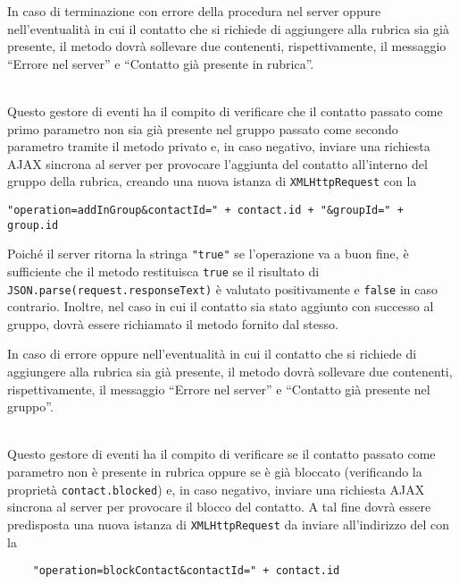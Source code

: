 \begin{description}
In caso di terminazione con errore della procedura nel server oppure nell'eventualità in cui il contatto che si richiede di aggiungere alla rubrica sia già presente, il metodo dovrà sollevare due  contenenti, rispettivamente, il messaggio ``Errore nel server'' e ``Contatto già presente in rubrica''.

\item{}\\
Questo gestore di eventi ha il compito di verificare che il contatto passato come primo parametro non sia già presente nel gruppo passato come secondo parametro tramite il metodo privato  e, in caso negativo, inviare una richiesta AJAX sincrona al server per provocare l'aggiunta del contatto all'interno del gruppo della rubrica, creando una nuova istanza di \verb'XMLHttpRequest' con la 
\begin{verbatim}
"operation=addInGroup&contactId=" + contact.id + "&groupId=" + group.id
\end{verbatim}

Poiché il server ritorna la stringa \verb'"true"' se l'operazione va a buon fine, è sufficiente che il metodo restituisca \verb'true' se il risultato di \verb'JSON.parse(request.responseText)' è valutato positivamente e \verb'false' in caso contrario. Inoltre, nel caso in cui il contatto sia stato aggiunto con successo al gruppo, dovrà essere richiamato il metodo  fornito dal  stesso.

In caso di errore oppure nell'eventualità in cui il contatto che si richiede di aggiungere alla rubrica sia già presente, il metodo dovrà sollevare due  contenenti, rispettivamente, il messaggio ``Errore nel server'' e ``Contatto già presente nel gruppo''.

\item{}\\
Questo gestore di eventi ha il compito di verificare se il contatto passato come parametro non è presente in rubrica oppure se è già bloccato (verificando la proprietà \verb'contact.blocked') e, in caso negativo, inviare una richiesta AJAX sincrona al server per provocare il blocco del contatto. A tal fine dovrà essere predisposta una nuova istanza di \verb'XMLHttpRequest' da inviare all'indirizzo del  con la 
\begin{verbatim}
    "operation=blockContact&contactId=" + contact.id
\end{verbatim}


\end{description}
